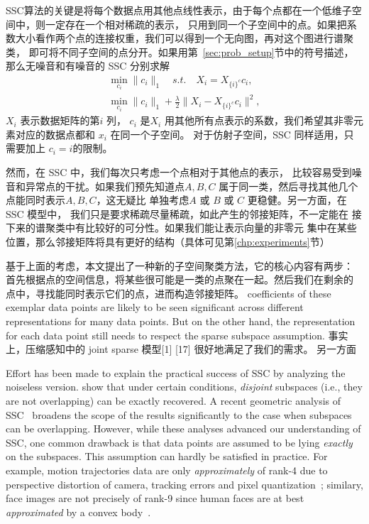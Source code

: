 \documentclass[main]{subfiles}
\begin{document}
SSC算法的关键是将每个数据点用其他点线性表示，由于每个点都在一个低维子空间中，则一定存在一个相对稀疏的表示，
只用到同一个子空间中的点。如果把系数大小看作两个点的连接权重，我们可以得到一个无向图，再对这个图进行谱聚类，
即可将不同子空间的点分开。如果用第~\ref{sec:prob_setup}节中的符号描述，那么无噪音和有噪音的 SSC 分别求解
\begin{align*}
  \min_{c_i} \|c_i\|_1\quad s.t.\quad X_i=X_{\{i\}^c}c_i, \\
  \min_{c_i} \|c_i\|_1+\frac{\lambda}{2}\|X_i-X_{\{i\}^c}c_i\|^2,
\end{align*}
$X_i$ 表示数据矩阵的第$i$ 列， $c_i$ 是$X_i$ 用其他所有点表示的系数，我们希望其非零元素对应的数据点都和 $x_i$ 在同一个子空间。
对于仿射子空间，SSC 同样适用，只需要加上 $c_i = i$的限制。

然而，在 SSC 中，我们每次只考虑一个点相对于其他点的表示，
比较容易受到噪音和异常点的干扰。如果我们预先知道点$A,B,C$
属于同一类，然后寻找其他几个点能同时表示$A,B,C$，这无疑比
单独考虑$A$ 或 $B$ 或 $C$ 更稳健。另一方面，在SSC 模型中，
我们只是要求稀疏尽量稀疏，如此产生的邻接矩阵，不一定能在
接下来的谱聚类中有比较好的可分性。如果我们能让表示向量的非零元
集中在某些位置，那么邻接矩阵将具有更好的结构（具体可见第\ref{chp:experiments}节）

基于上面的考虑，本文提出了一种新的子空间聚类方法，它的核心内容有两步：
首先根据点的空间信息，将某些很可能是一类的点聚在一起。然后我们在剩余的
点中，寻找能同时表示它们的点，进而构造邻接矩阵。
coefficients of these exemplar data points are likely to be
seen significant across different representations for many
data points. But on the other hand, the representation for
each data point still needs to respect the sparse subspace
assumption. 事实上，压缩感知中的 joint sparse 模型[1]  [17] 很好地满足了我们的需求。
另一方面

Effort has been made to explain the practical success of SSC by analyzing the noiseless version. \cite{elhamifar2010ssc_icassp} show that under certain conditions, \emph{disjoint} subspaces (i.e., they are not overlapping) can be exactly recovered.
A recent geometric analysis of SSC~\cite{soltanolkotabi2011geometric} broadens the scope of the results significantly to the case when subspaces can be overlapping. However, while these analyses advanced our understanding of SSC, one common drawback
is that data points are assumed to be lying {\em exactly} on the subspaces. This assumption can hardly be satisfied in practice. For example, motion trajectories data are only {\em approximately} of rank-4 due to perspective distortion of camera, tracking errors and pixel quantization~\cite{costeira1998motion_seg}; similary, face images are   not precisely of rank-9 since human faces are at best {\em approximated} by a convex body~\cite{basri2003lambertianface}.
\end{document}
